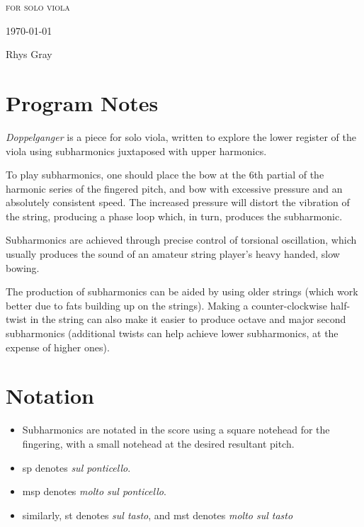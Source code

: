 
\invisiblechapter{\violaPiece}

\vspace{3.8cm}

\begin{center}

\textsc{for solo viola}

\vspace{2.8cm}

\HRule{0.5pt}

\LARGE \textbf{\uppercase{\violaPiece}}

\HRule{2pt}

\vspace{1.8cm}

\normalsize \today

\vspace{3.8cm}

Rhys Gray

\end{center}
\newpage

\section*{Program Notes}
\emph{Doppelganger} is a piece for solo viola, written to explore the lower register of the viola using subharmonics juxtaposed with upper harmonics. 

To play subharmonics, one should place the bow at the 6th partial of the harmonic series of the fingered pitch, and bow with excessive pressure and an absolutely consistent speed. 
The increased pressure will distort the vibration of the string, producing a phase loop which, in turn, produces the subharmonic. 

Subharmonics are achieved through precise control of torsional oscillation, which usually produces the sound of an amateur string player's heavy handed, slow bowing. 

The production of subharmonics can be aided by using older strings (which work better due to fats building up on the strings). 
Making a counter-clockwise half-twist in the string can also make it easier to produce octave and major second subharmonics (additional twists can help achieve lower subharmonics, at the expense of higher ones).

\section*{Notation}
\begin{itemize}

    \item Subharmonics are notated in the score using a square notehead for the fingering, with a small notehead at the desired resultant pitch.
    \item sp denotes \emph{sul ponticello}.
    \item msp denotes \emph{molto sul ponticello}.
    \item similarly, st denotes \emph{sul tasto}, and mst denotes \emph{molto sul tasto}
\end{itemize}

\newpage

% 
\label{app:doppelganger Score}
